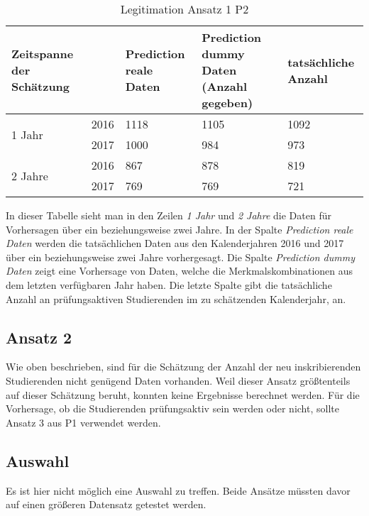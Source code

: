 \begin{table}[ht]
  \caption{\label{tab:legitimationA1P2} Legitimation Ansatz 1 P2}
  \begin{tabular}{ p{2.5cm} p{1cm} p{3cm} p{3cm} p{3cm} }
    \toprule
    Zeitspanne der Sch\"atzung &      & Prediction reale Daten & Prediction dummy Daten (Anzahl gegeben) & tats\"achliche Anzahl \\
    \midrule
    \multirow{2}{3em}{1 Jahr}
                               & 2016 & 1118                   & 1105                                    & 1092                  \\
                               & 2017 & 1000                   & 984                                     & 973                   \\
    \midrule
    \multirow{2}{4em}{2 Jahre}
                               & 2016 & 867                    & 878                                     & 819                   \\
                               & 2017 & 769                    & 769                                     & 721                   \\

    \bottomrule
  \end{tabular}
\end{table}

In dieser Tabelle sieht man in den Zeilen \textit{1 Jahr} und \textit{2 Jahre} die Daten f\"ur Vorhersagen \"uber ein beziehungsweise zwei Jahre.
In der Spalte \textit{Prediction reale Daten} werden die tats\"achlichen Daten aus den Kalenderjahren 2016 und 2017 \"uber ein beziehungsweise
zwei Jahre vorhergesagt. Die Spalte \textit{Prediction dummy Daten} zeigt eine Vorhersage von Daten, welche die Merkmalskombinationen aus dem letzten
verf\"ugbaren Jahr haben. Die letzte Spalte gibt die tats\"achliche Anzahl an pr\"ufungsaktiven Studierenden im zu sch\"atzenden Kalenderjahr, an.

\subsection{Ansatz 2}
Wie oben beschrieben, sind f\"ur die Sch\"atzung der Anzahl der neu inskribierenden Studierenden nicht gen\"ugend Daten vorhanden.
Weil dieser Ansatz gr\"o{\ss}tenteils auf dieser Sch\"atzung beruht, konnten keine Ergebnisse berechnet werden. F\"ur die Vorhersage,
ob die Studierenden pr\"ufungsaktiv sein werden oder nicht, sollte Ansatz 3 aus P1 verwendet werden.

\subsection{Auswahl}
Es ist hier nicht m\"oglich eine Auswahl zu treffen. Beide Ans\"atze m\"ussten davor auf einen gr\"o{\ss}eren Datensatz getestet werden.
